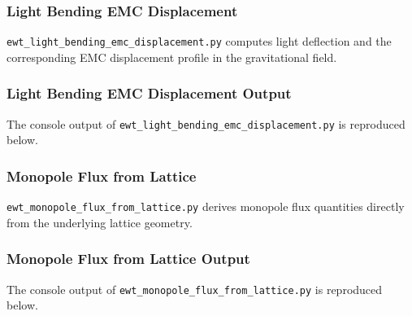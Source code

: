 \documentclass[10pt,a4paper]{article}
\begin{document}
\subsubsection{Light Bending EMC Displacement}
\label{app:ewt_light_bending_emc_displacement}

\texttt{ewt\_light\_bending\_emc\_displacement.py} computes light deflection and the corresponding EMC displacement profile in the gravitational field.



\subsubsection{Light Bending EMC Displacement Output}
\label{app:ewt_light_bending_emc_displacement_output}

The console output of \texttt{ewt\_light\_bending\_emc\_displacement.py} is reproduced below.



\subsubsection{Monopole Flux from Lattice}
\label{app:ewt_monopole_flux_from_lattice}

\texttt{ewt\_monopole\_flux\_from\_lattice.py} derives monopole flux quantities directly from the underlying lattice geometry.



\subsubsection{Monopole Flux from Lattice Output}
\label{app:ewt_monopole_flux_from_lattice_output}

The console output of \texttt{ewt\_monopole\_flux\_from\_lattice.py} is reproduced below.
\end{document}
